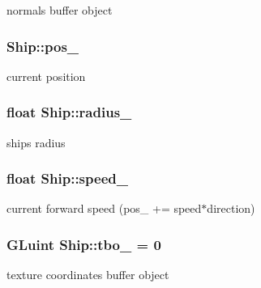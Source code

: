 normals buffer object 

\subsubsection[{\texorpdfstring{pos\+\_\+}{pos_}}]{ Ship\+::pos\+\_\+}\hypertarget{classShip_abb51f0860d7fecc14bc10b8955ca2f61}{}\label{classShip_abb51f0860d7fecc14bc10b8955ca2f61}


current position 

\subsubsection[{\texorpdfstring{radius\+\_\+}{radius_}}]{\setlength{\rightskip}{0pt plus 5cm}float Ship\+::radius\+\_\+}\hypertarget{classShip_a4fd3b5e924dfd2d5e8484d769be8a758}{}\label{classShip_a4fd3b5e924dfd2d5e8484d769be8a758}


ship\textquotesingle{}s radius 

\subsubsection[{\texorpdfstring{speed\+\_\+}{speed_}}]{\setlength{\rightskip}{0pt plus 5cm}float Ship\+::speed\+\_\+}\hypertarget{classShip_a0f013dc95c2aa775f3245fd603179983}{}\label{classShip_a0f013dc95c2aa775f3245fd603179983}


current forward speed (pos\+\_\+ += speed$\ast$direction) 

\subsubsection[{\texorpdfstring{tbo\+\_\+}{tbo_}}]{\setlength{\rightskip}{0pt plus 5cm}G\+Luint Ship\+::tbo\+\_\+ = 0\hspace{0.3cm}{\ttfamily [private]}}\hypertarget{classShip_a109cc987e9d6ec0245bcf6b839f2216c}{}\label{classShip_a109cc987e9d6ec0245bcf6b839f2216c}


texture coordinates buffer object 

